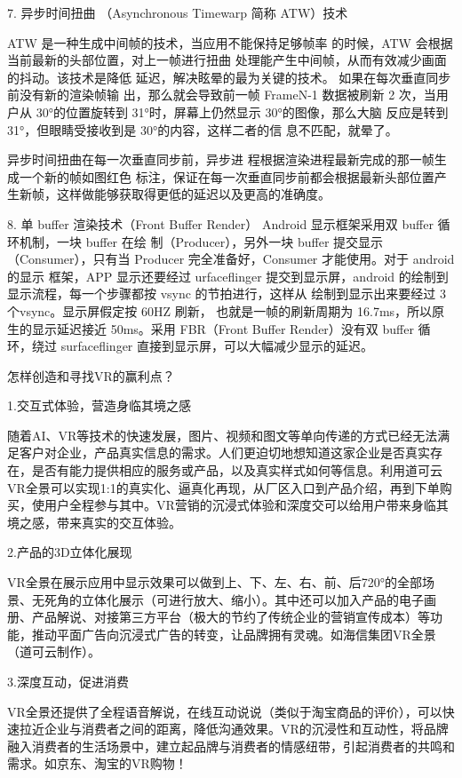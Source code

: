 \documentclass{article}
\begin{document}
7. 异步时间扭曲 （Asynchronous Timewarp 简称 ATW）技术 \par
ATW 是一种生成中间帧的技术，当应用不能保持足够帧率 的时候，ATW 会根据当前最新的头部位置，对上一帧进行扭曲 处理能产生中间帧，从而有效减少画面的抖动。该技术是降低 延迟，解决眩晕的最为关键的技术。 如果在每次垂直同步前没有新的渲染帧输 出，那么就会导致前一帧 FrameN-1 数据被刷新 2 次，当用户从 30°的位置旋转到 31°时，屏幕上仍然显示 30°的图像，那么大脑 反应是转到 31°，但眼睛受接收到是 30°的内容，这样二者的信 息不匹配，就晕了。\par
异步时间扭曲在每一次垂直同步前，异步进 程根据渲染进程最新完成的那一帧生成一个新的帧如图红色 标注，保证在每一次垂直同步前都会根据最新头部位置产生新帧，这样做能够获取得更低的延迟以及更高的准确度。\par
8. 单 buffer 渲染技术（Front Buffer Render） 
Android 显示框架采用双 buffer 循环机制，一块 buffer 在绘 制（Producer），另外一块 buffer 提交显示（Consumer），只有当 Producer 完全准备好，Consumer 才能使用。对于 android 的显示 框架，APP 显示还要经过 urfaceflinger 
提交到显示屏，android 的绘制到显示流程，每一个步骤都按 vsync 的节拍进行，这样从 绘制到显示出来要经过 3 个vsync。显示屏假定按 60HZ 刷新， 也就是一帧的刷新周期为 16.7ms，所以原生的显示延迟接近 50ms。采用 FBR（Front Buffer Render）没有双 buffer 循环，绕过 surfaceflinger 直接到显示屏，可以大幅减少显示的延迟。\par
怎样创造和寻找VR的赢利点？\par
1.交互式体验，营造身临其境之感\par
随着AI、VR等技术的快速发展，图片、视频和图文等单向传递的方式已经无法满足客户对企业，产品真实信息的需求。人们更迫切地想知道这家企业是否真实存在，是否有能力提供相应的服务或产品，以及真实样式如何等信息。利用道可云VR全景可以实现1:1的真实化、逼真化再现，从厂区入口到产品介绍，再到下单购买，使用户全程参与其中。VR营销的沉浸式体验和深度交可以给用户带来身临其境之感，带来真实的交互体验。\par
2.产品的3D立体化展现\par
VR全景在展示应用中显示效果可以做到上、下、左、右、前、后720°的全部场景、无死角的立体化展示（可进行放大、缩小）。其中还可以加入产品的电子画册、产品解说、对接第三方平台（极大的节约了传统企业的营销宣传成本）等功能，推动平面广告向沉浸式广告的转变，让品牌拥有灵魂。如海信集团VR全景（道可云制作）。\par
3.深度互动，促进消费\par
VR全景还提供了全程语音解说，在线互动说说（类似于淘宝商品的评价），可以快速拉近企业与消费者之间的距离，降低沟通效果。VR的沉浸性和互动性，将品牌融入消费者的生活场景中，建立起品牌与消费者的情感纽带，引起消费者的共鸣和需求。如京东、淘宝的VR购物！\par
\end{document}
